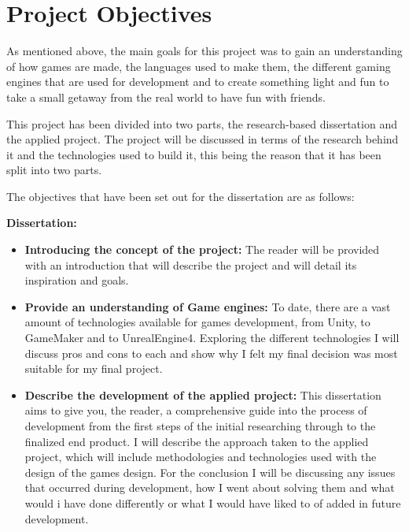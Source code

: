 \newpage


\section{Project Objectives}

As mentioned above, the main goals for this project was to gain an understanding of how games are made, the languages used to make them, the different gaming engines that are used for development and to create something light and fun to take a small getaway from the real world to have fun with friends.

This project has been divided into two parts, the research-based dissertation and the applied project. The project will be discussed in terms of the research behind it and the technologies used to build it, this being the reason that it has been split into two parts.\par
The objectives that have been set out for the dissertation are as follows: \par

\textbf {Dissertation:}

\begin{itemize}
  \item \textbf {Introducing the concept of the project:} The reader will be provided with an introduction that will describe the project and will detail its inspiration and goals.\par
  \item \textbf {Provide an understanding of Game engines:} To date, there are a vast amount of technologies available for games development, from Unity, to GameMaker and to UnrealEngine4. Exploring the different technologies I will discuss pros and cons to each and show why I felt my final decision was most suitable for my final project. \par
  \item \textbf {Describe the development of the applied project:} This dissertation aims to give you, the reader, a comprehensive guide into the process of development from the first steps of the initial researching through to the finalized end product. I will describe the approach taken to the applied project, which will include methodologies and technologies used with the design of the games design. For the conclusion I will be discussing any issues that occurred during development, how I went about solving them and what would i have done differently or what I would have liked to of added in future development.\par
\end{itemize}



